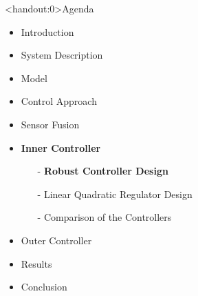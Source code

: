 
\begin{frame}<handout:0>{Agenda}{}
    \begin{itemize}
        \item Introduction
        \item System Description
        \item Model
        \item Control Approach
        \item Sensor Fusion
        \item \textcolor{aaublue}{\textbf{Inner Controller}}
        \begin{itemize}
            \item[-] \textcolor{aaublue}{\textbf{Robust Controller Design}}
            \item[-] Linear Quadratic Regulator Design
            \item[-] Comparison of the Controllers
        \end{itemize}
        \item Outer Controller
        \item Results
        \item Conclusion
    \end{itemize}
\end{frame}